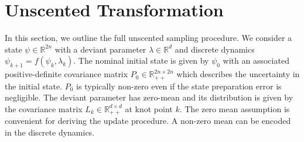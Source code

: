 \section{Unscented Transformation}
\label{appendix:unscented}
In this section, we outline the full unscented sampling procedure.
We consider a state $\psi \in \mathbb{R}^{2n}$ with
a deviant parameter $\lambda \in \mathbb{R}^{d}$ and discrete dynamics
$\psi_{k + 1} = f(\psi_{k}, \lambda_{k})$.
The nominal initial state is given by $\psi_{0}$ with an associated
positive-definite covariance matrix $P_{0} \in \mathbb{R}_{++}^{2n \times 2n}$
which describes the uncertainty in the initial state.
$P_{0}$ is typically non-zero even if the state preparation error is negligible.
The deviant parameter
has zero-mean and its distribution is given by the covariance matrix
$L_{k} \in \mathbb{R}_{++}^{d \times d}$ at knot point $k$. The zero mean assumption
is convenient for deriving the update procedure. A non-zero mean can be encoded
in the discrete dynamics.

